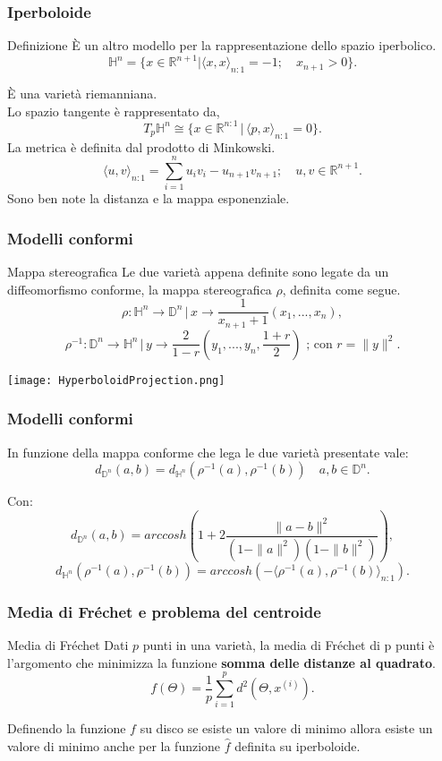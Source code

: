 \documentclass{beamer}
\begin{document}
\begin{frame}
\frametitle{Iperboloide}
\begin{beamerboxesrounded}{Definizione}
\`E un altro modello per la rappresentazione dello spazio iperbolico.
\[\mathbb{H}^n = \{x \in \mathbb{R}^{n+1} | \langle x, x \rangle_{n:1} = -1; \quad x_{n+1} > 0 \}.\]
\end{beamerboxesrounded}
\bigskip
\`E una \alert{varietà riemanniana}.\\
Lo spazio tangente è rappresentato da,
\[T_p\mathbb{H}^n \cong \{x \in \mathbb{R}^{n:1} \, | \, \langle p,x \rangle_{n:1} = 0\}.\]
La \alert{metrica} è definita dal \alert{prodotto di Minkowski}.
\[\langle u, v \rangle_{n:1} = \sum_{i=1}^{n} u_iv_i - u_{n+1}v_{n+1}; \quad u,v \in \mathbb{R}^{n+1}.\]
Sono ben note la \alert{distanza} e la \alert{mappa esponenziale}.
\end{frame}

\begin{frame}
\frametitle{Modelli conformi}
\begin{beamerboxesrounded}{Mappa stereografica}
Le due varietà appena definite sono legate da un \alert{diffeomorfismo conforme}, la mappa stereografica $\rho$, definita come segue.
\[\rho : \mathbb{H}^n \to \mathbb{D}^n \, | \, x \to \frac{1}{x_{n+1} + 1}(x_1, ..., x_n),\]
\[\rho^{-1} : \mathbb{D}^n \to \mathbb{H}^n \, | \, y \to \frac{2}{1 - r}(y_1, ..., y_n, \frac{1+r}{2}) \mbox{ ; con } r = \| y \|^2.\]
\end{beamerboxesrounded}
\begin{center}
    \texttt{[image: HyperboloidProjection.png]} 
\end{center}
\end{frame}

\begin{frame}
\frametitle{Modelli conformi}
\begin{beamerboxesrounded}{}
In funzione della mappa conforme che lega le due varietà presentate vale:\\
\[d_{\mathbb{D}^n}(a, b) = d_{\mathbb{H}^n}(\rho^{-1}(a), \rho^{-1}(b)) \quad a, b \in \mathbb{D}^n.\]
\end{beamerboxesrounded}
\bigskip
Con:
\[ d_{\mathbb{D}^n}(a,b) = arccosh(1 + 2\frac{\| a - b \|^2}{(1 - \| a \|^2)(1 - \| b \|^2)}),\]
\[ d_{\mathbb{H}^n}(\rho^{-1}(a),\rho^{-1}(b)) = arccosh(- \langle \rho^{-1}(a),\rho^{-1}(b) \rangle_{n:1}).\]
\end{frame}

\begin{frame}
\frametitle{Media di Fréchet e problema del centroide}
\begin{beamerboxesrounded}{Media di Fréchet}
Dati $p$ punti in una varietà, la media di Fréchet di p punti è \alert{l’argomento che minimizza} la funzione \textbf{somma delle distanze al quadrato}.
\[f(\Theta) = \frac{1}{p}\sum_{i=1}^p d^2(\Theta, x^{(i)}).\]
\end{beamerboxesrounded}
\bigskip
Definendo la funzione $f$ su disco se esiste un valore di minimo allora esiste un valore di minimo anche per la funzione $\hat{f}$ definita su iperboloide.
\end{frame}
\end{document}
